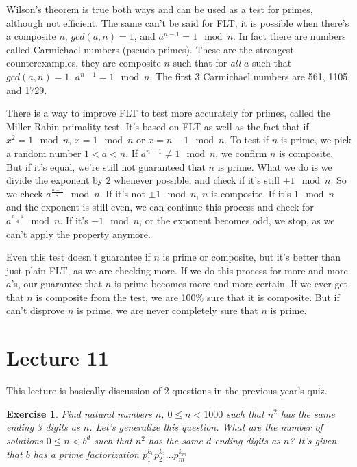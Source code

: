 \documentclass[a4paper,10pt]{article}
\newtheorem{exercise}{Exercise}[section]
\theoremstyle{definition} %
\begin{document}
    Wilson's theorem is true both ways and can be used as a test for primes, although not efficient.
    The same can't be said for FLT, it is possible when there's a composite $n$, $gcd(a,n)=1$,
    and $a^{n-1} = 1 \mod n$. In fact there are numbers called Carmichael numbers (pseudo primes).
    These are the strongest counterexamples, they are composite $n$ such that for \emph{all}
    $a$ such that $gcd(a,n)=1$, $a^{n-1}=1 \mod n$. The first 3 Carmichael numbers are 561, 1105, and 
    1729.

    There is a way to improve FLT to test more accurately for primes, called the Miller
    Rabin primality test. It's based on FLT as well as the fact that if  $x^2 = 1 \mod n$,
    $x = 1 \mod n $ or $x = n-1 \mod n$. To test if $n$ is prime, we pick a random number
    $1 < a < n$. If $a^{n-1} \neq 1 \mod n$, we confirm $n$ is composite. But if it's equal,
    we're still not guaranteed that $n$ is prime. What we do is we divide the exponent by $2$
    whenever possible, and check if it's still $\pm 1 \mod n$. So we check $a^{\frac{n-1}{2}} \mod n$.
    If it's not $\pm 1 \mod n$, $n$ is composite. If it's $1 \mod n$ and the exponent is still
    even, we can continue this process and check for $a^{\frac{n-1}{4}} \mod n$. If it's 
    $-1 \mod n$, or the exponent becomes odd, we stop, as we can't apply the property anymore.

    Even this test doesn't guarantee if $n$ is prime or composite, but it's better than just 
    plain FLT, as we are checking more. If we do this process for more and more $a$'s, our guarantee
    that $n$ is prime becomes more and more certain. If we ever get that $n$ is composite 
    from the test, we are 100\% sure that it is composite. But if can't disprove $n$ is prime, 
    we are never completely sure that $n$ is prime.

    \section{Lecture 11}

    This lecture is basically discussion of 2 questions in the previous year's quiz.

    \begin{exercise}
        Find natural numbers $n$, $0 \leq n < 1000$ such that $n^2$ has the same ending 3 digits 
        as $n$. Let's generalize this question. What are the number of solutions $0 \leq n < b^d$ 
        such that $n^2$ has the same $d$ ending digits as $n$? It's given that $b$ has a prime 
        factorization $p_1^{k_1}p_2^{k_2} \dots p_m^{k_m}$
    \end{exercise}
\end{document}
